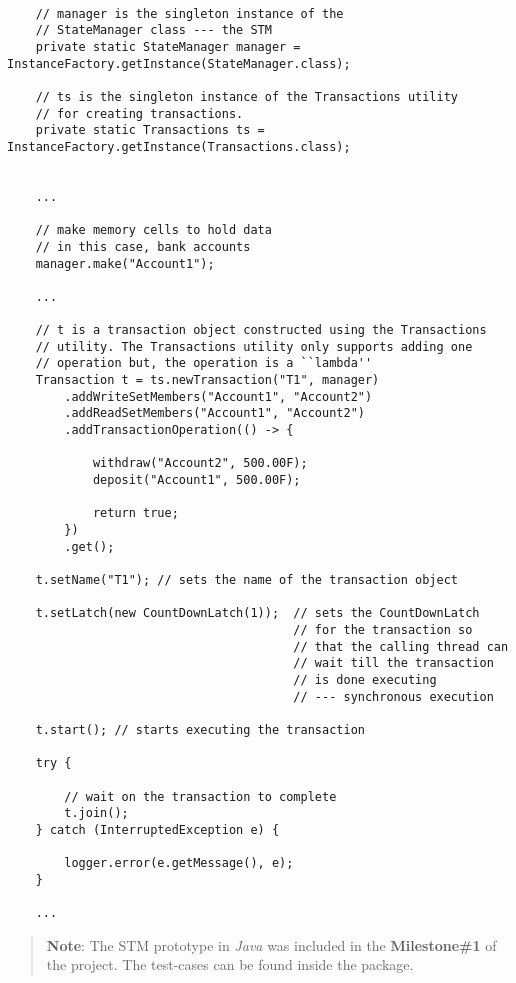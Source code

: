 \documentclass[../main]{subfiles}
\begin{document}
  \begin{lstlisting}

    // manager is the singleton instance of the
    // StateManager class --- the STM
    private static StateManager manager = InstanceFactory.getInstance(StateManager.class);

    // ts is the singleton instance of the Transactions utility 
    // for creating transactions.
    private static Transactions ts = InstanceFactory.getInstance(Transactions.class);


    ...

    // make memory cells to hold data
    // in this case, bank accounts
    manager.make("Account1");

    ...

    // t is a transaction object constructed using the Transactions 
    // utility. The Transactions utility only supports adding one
    // operation but, the operation is a ``lambda''
    Transaction t = ts.newTransaction("T1", manager)
        .addWriteSetMembers("Account1", "Account2")
        .addReadSetMembers("Account1", "Account2")
        .addTransactionOperation(() -> {
            
            withdraw("Account2", 500.00F);
            deposit("Account1", 500.00F);
            
            return true;
        })
        .get();
    
    t.setName("T1"); // sets the name of the transaction object
    
    t.setLatch(new CountDownLatch(1));  // sets the CountDownLatch
                                        // for the transaction so 
                                        // that the calling thread can
                                        // wait till the transaction
                                        // is done executing 
                                        // --- synchronous execution
    
    t.start(); // starts executing the transaction
    
    try {
        
        // wait on the transaction to complete
        t.join();
    } catch (InterruptedException e) {
        
        logger.error(e.getMessage(), e);
    }

    ...

  \end{lstlisting}

  \par
  \begin{verse}
    {\bf Note}: The STM prototype in {\em Java} was included in the {\bf Milestone\#1} of the project. The test-cases can be found inside the  package.
  \end{verse}
\end{document}
